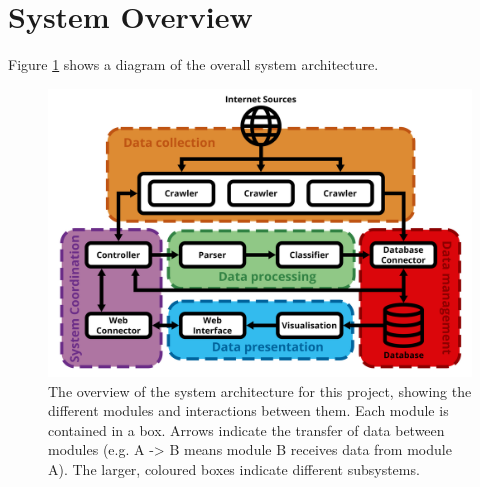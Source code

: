 \documentclass{l4proj}
\begin{document}
\section{System Overview}
Figure \ref{fig:system_overview_diagram} shows a diagram of the overall system architecture.
 \begin{figure}[h]
\centering
\includegraphics[width=\textwidth]{images/system_overview_diagram.png}
\caption{The overview of the system architecture for this project, showing the different modules and interactions between them. Each module is contained in a box. Arrows indicate the transfer of data between modules (e.g. A -> B means module B receives data from module A). The larger, coloured boxes indicate different subsystems.}
\label{fig:system_overview_diagram}
\end{figure}
\par
\end{document}
